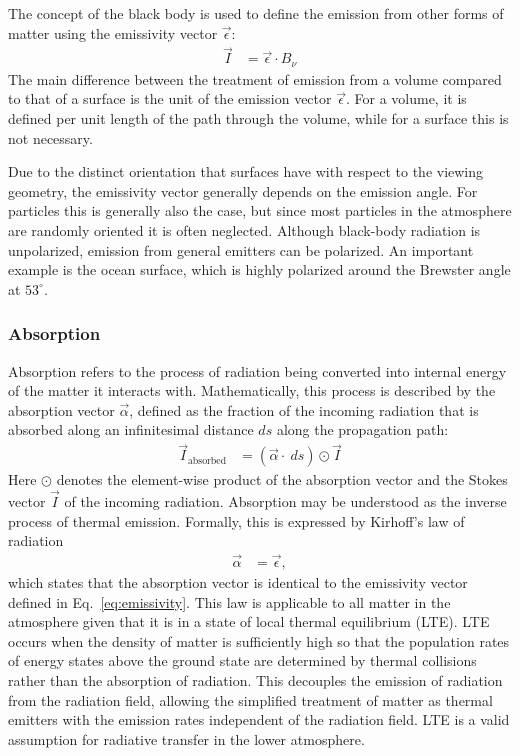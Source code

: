 The concept of the black body is used to define the emission from other forms
of matter using the emissivity vector $\vec{\epsilon}$:
\begin{align}\label{eq:emissivity}
 \vec{I} &= \vec{\epsilon} \cdot B_\nu
\end{align}
The main difference between the treatment of emission from a volume compared
to that of a surface is the unit of the emission vector $\vec{\epsilon}$. For
a volume, it is defined per unit length of the path through the volume, while
for a surface this is not necessary.

Due to the distinct orientation that surfaces have with respect to the viewing
geometry, the emissivity vector generally depends on the emission angle. For
particles this is generally also the case, but since most particles in the
atmosphere are randomly oriented it is often neglected. Although black-body
radiation is unpolarized, emission from general emitters can be polarized. An
important example is the ocean surface, which is highly polarized around the
Brewster angle at $53^\circ$.

\subsubsection{Absorption}

Absorption refers to the process of radiation being converted into internal
energy of the matter it interacts with. Mathematically, this process is described
by the absorption vector $\vec{\alpha}$, defined as the fraction of the incoming
radiation that is absorbed along an infinitesimal distance $ds$ along the
propagation path:
\begin{align}
\vec{I}_\text{absorbed} &= (\vec{\alpha} \cdot\ ds) \odot \vec{I}
\end{align}
Here $\odot$ denotes the element-wise product of the absorption vector and
the Stokes vector $\vec{I}$ of the incoming radiation. Absorption may be
understood as the inverse process of thermal emission. Formally, this is
expressed by Kirhoff's  law of radiation
\begin{align}
  \vec{\alpha} &= \vec{\epsilon},
\end{align}
which states that the absorption vector is identical to the emissivity
vector defined in Eq.~\ref{eq:emissivity}.
This law is applicable to all matter in the atmosphere given that it is in a
state of local thermal equilibrium (LTE). LTE occurs when the density of matter
is sufficiently high so that the population rates of energy states above the
ground state are determined by thermal collisions rather than the absorption of
radiation. This decouples the emission of radiation from the radiation field,
allowing the simplified treatment of matter as thermal emitters with the
emission rates independent of the radiation field. LTE is a valid assumption for
radiative transfer in the lower atmosphere.

